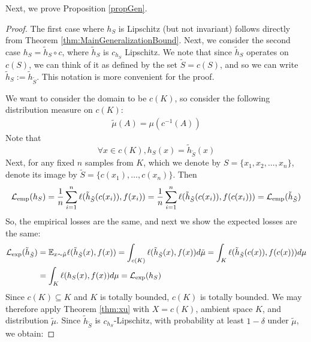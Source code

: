 Next, we prove Proposition \ref{propGen}.
\generalizationbound*
\begin{proof}
\label{proof_of_three_cases}
The first case where $h_S$ is Lipschitz (but not invariant) follows directly from Theorem \ref{thm:MainGeneralizationBound}.
Next, we  consider the second case $h_S=\tilde{h}_{S}\circ c$, where $\tilde{h}_{S}$ is $c_{h_S}$ Lipschitz. We note that since $\tilde{h}_S$ operates on $c(S)$, we can think of it as defined by the set $\tilde S=c(S) $, and so we can write $\tilde{h}_S:=\tilde{h}_{\tilde S}$. This notation is more convenient for the proof.

We want to consider the domain to be $c(K)$, so consider the following distribution measure on $c(K)$:
    \begin{align*}
        \tilde{\mu}(A)= \mu(c^{-1}(A))
    \end{align*}
    Note that $$\forall x \in c(K), h_S(x)=\tilde{h}_{\tilde{S}}(x) $$
    Next, for any fixed $n$ samples from $K$, which we denote by $S=\{x_1,x_2,\ldots,x_n\}$, denote its image by $\tilde S=\{c(x_1),\ldots,c(x_n)\}$.  Then
    \begin{align*}
        \mathcal{L}_{\mathrm{emp}}(h_S)=\frac{1}{n}\sum_{i=1}^n \ell(\tilde h_{\tilde S}(c(x_i)),f(x_i)) = \frac{1}{n}\sum_{i=1}^n \ell(\tilde h_{\tilde S}(c(x_i)),f(c(x_i))) = \mathcal{L}_{\mathrm{emp}}(\tilde{h}_{\tilde S})
    \end{align*}
    So, the empirical losses are the same, and next we show the expected losses are the same:
    \begin{align*}
        \mathcal{L}_{\mathrm{exp}}(\tilde{h}_{\tilde S}) &= \mathbb{E}_{x \sim \tilde{\mu}} \ell(\tilde{h}_{\tilde S}(x),f(x)) = \int_{c(K)} \ell(\tilde{h}_{\tilde S}(x),f(x)) d\tilde{\mu} = \int_{K} \ell(\tilde{h}_{\tilde S}(c(x)),f(c(x))) d\mu  \\
        &=\int_{K} \ell(h_S(x),f(x)) d\mu = \mathcal{L}_{\mathrm{exp}}(h_S)
    \end{align*}
    Since $c(K)\subseteq K$ and $K$ is totally bounded, $c(K)$ is totally bounded. We may therefore apply Theorem \ref{thm:xu} with $X=c(K)$, ambient space $K$, and distribution $\tilde{\mu}$. Since $\tilde{h}_{\tilde S}$ is $c_{h_S}$-Lipschitz, with probability at least $1-\delta$ under $\tilde{\mu}$, we obtain:


\end{proof}
